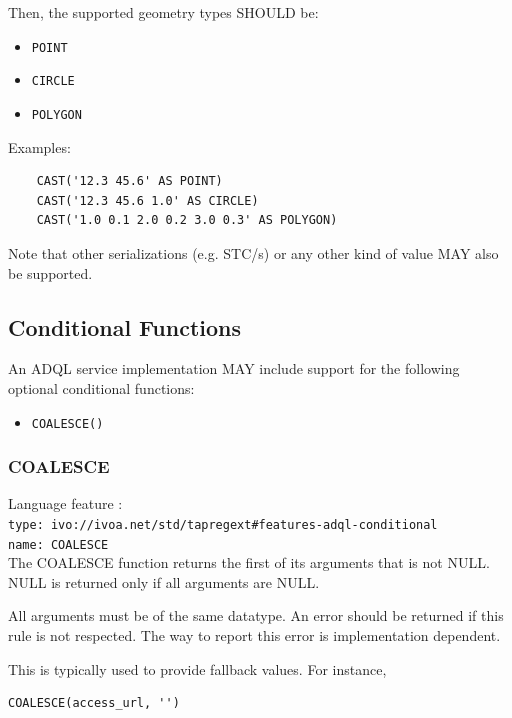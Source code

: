 \documentclass[11pt,a4paper]{ivoa}
\begin{document}
Then, the supported geometry types SHOULD be:

\begin{itemize}
    \item \verb:POINT:
    \item \verb:CIRCLE:
    \item \verb:POLYGON:
\end{itemize}

Examples:

\begin{verbatim}
    CAST('12.3 45.6' AS POINT)
    CAST('12.3 45.6 1.0' AS CIRCLE)
    CAST('1.0 0.1 2.0 0.2 3.0 0.3' AS POLYGON)
\end{verbatim}

Note that other serializations (e.g. STC/s) or any other kind of value MAY also
be supported.

\subsection{Conditional Functions}
\label{sec:condfunc}

An ADQL service implementation MAY include support for the following optional
conditional functions: 

\begin{itemize}
    \item \verb:COALESCE():
\end{itemize}

\subsubsection{COALESCE}
{\footnotesize Language feature :}\\
{\footnotesize \verb|type: ivo://ivoa.net/std/tapregext#features-adql-conditional|}\\
{\footnotesize \verb|name: COALESCE|}\\

The COALESCE function returns the first of its arguments that is not
NULL. NULL is returned only if all arguments are NULL. 

All arguments must be of the same datatype. An error should be returned
if this rule is not respected. The way to report this error is
implementation dependent.

This is typically used to provide fallback values.  For instance,

\begin{verbatim}
COALESCE(access_url, '')
\end{verbatim}
\end{document}
